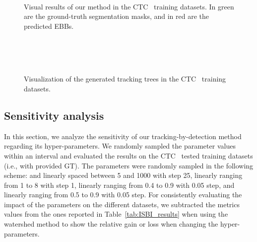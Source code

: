 \documentclass{article}
\begin{document}
\begin{figure}[]
\centering
{}~
\\
~
\\
~
\\
\caption[Visual results of our method in the CTC training datasets.]{Visual results of our method in the CTC~\cite{isbi} training datasets. In green are the ground-truth segmentation masks, and in red are the predicted EBBs.}
\label{fig:visual_results}
\end{figure}

\begin{figure}[]
\centering
{}~
\\
~
\\
~
\\
\caption[Visualization of the generated tracking trees in the CTC training datasets.]{Visualization of the generated tracking trees in the CTC~\cite{isbi} training datasets.}
\label{fig:tracking_trees}
\end{figure}

\subsection{Sensitivity analysis}\label{sec:abblation}

In this section, we analyze the sensitivity of our tracking-by-detection method regarding its hyper-parameters. We randomly sampled the parameter values within an interval and evaluated the results on the CTC~\cite{isbi} tested training datasets (i.e., with provided GT). The parameters were randomly sampled in the following scheme:  and  linearly spaced between 5 and 1000 with step 25,  linearly ranging from 1 to 8 with step 1,  linearly ranging from 0.4 to 0.9 with 0.05 step, and  linearly ranging from 0.5 to 0.9 with 0.05 step. For consistently evaluating the impact of the parameters on the different datasets, we subtracted the metrics values from the ones reported in Table~\ref{tab:ISBI_results} when using the watershed method to show the relative gain or loss when changing the hyper-parameters.
\end{document}
